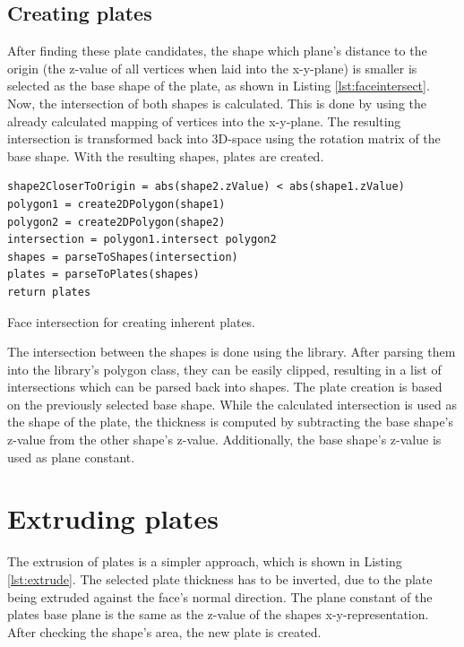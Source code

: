 \documentclass[../ClassicThesis.tex]{subfiles}
\begin{document}
\subsection{Creating plates}

After finding these plate candidates, the shape which plane's distance to the origin (the z-value of all vertices when laid into the x-y-plane) is smaller is selected as the base shape of the plate, as shown in Listing \ref{lst:faceintersect}. Now, the intersection of both shapes is calculated. This is done by using the already calculated mapping of vertices into the x-y-plane. The resulting intersection is transformed back into 3D-space using the rotation matrix of the base shape. With the resulting shapes, plates are created.

\begin{listing}[ht]
\begin{verbatim}
shape2CloserToOrigin = abs(shape2.zValue) < abs(shape1.zValue)
polygon1 = create2DPolygon(shape1)
polygon2 = create2DPolygon(shape2)
intersection = polygon1.intersect polygon2
shapes = parseToShapes(intersection)
plates = parseToPlates(shapes)
return plates
\end{verbatim}
\caption{Face intersection for creating inherent plates.}
\label{lst:faceintersect}
\end{listing}

The intersection between the shapes is done using the \jsclipper library. After parsing them into the library's polygon class, they can be easily clipped, resulting in a list of intersections which can be parsed back into shapes. The plate creation is based on the previously selected base shape. While the calculated intersection is used as the shape of the plate, the thickness is computed by subtracting the base shape's z-value from the other shape's z-value. Additionally, the base shape's z-value is used as plane constant.

\section{Extruding plates}

The extrusion of plates is a simpler approach, which is shown in Listing \ref{lst:extrude}. The selected plate thickness has to be inverted, due to the plate being extruded against the face's normal direction. The plane constant of the plates base plane is the same as the z-value of the shapes x-y-representation. After checking the shape's area, the new plate is created.
\end{document}
